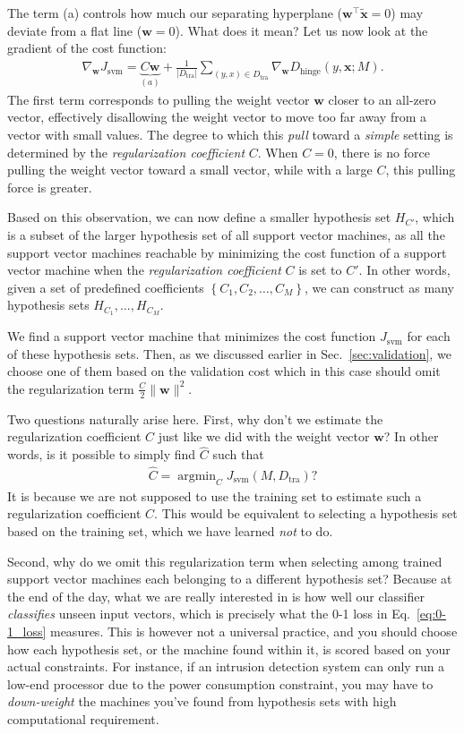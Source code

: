 \documentclass{report}
\newcommand{\vect}[1]{\mathbf{#1}}
\newcommand{\vx}[0]{\vect{x}}
\newcommand{\vw}[0]{\vect{w}}
\DeclareMathOperator*{\argmin}{\arg \min}
\newcommand{\hinge}{\text{hinge}}
\newcommand{\tra}{\text{tra}}
\begin{document}
The term (a) controls how much our separating hyperplane ($\vw^\top
\tilde{\vx}=0$) may deviate from a flat line ($\vw = 0$). What does it mean? Let
us now look at the gradient of the cost function:
\begin{align*}
    \nabla_{\vw} J_{\text{svm}} = 
    \underbrace{
    C \vw 
}_{(a)}
    + 
    \frac{1}{|D_{\tra}|} \sum_{(y,x)
    \in D_{\tra}} \nabla_{\vw} D_{\hinge}(y, \vx; M).
\end{align*}
The first term corresponds to pulling the weight vector $\vw$ closer to an
all-zero vector, effectively disallowing the weight vector to move too far away
from a vector with small values. The degree to which this {\it pull} toward a
{\it simple} setting is determined by the {\it regularization coefficient} $C$.
When $C=0$, there is no force pulling the weight vector toward a small vector,
while with a large $C$, this pulling force is greater. 

Based on this observation, we can now define a smaller hypothesis set $H_{C'}$,
which is a subset of the larger hypothesis set of all support vector machines,
as all the support vector machines reachable by minimizing the cost function of
a support vector machine when the {\it regularization coefficient} $C$ is set to
$C'$. In other words, given a set of predefined coefficients $\left\{ C_1, C_2,
\ldots, C_M\right\}$, we can construct as many hypothesis sets $H_{C_1}, \ldots,
H_{C_M}$. 

We find a support vector machine that minimizes the cost function
$J_{\text{svm}}$ for each of these hypothesis sets. Then, as we discussed
earlier in Sec.~\ref{sec:validation}, we choose one of them based on the
validation cost which in this case should omit the regularization term
$\frac{C}{2} \|\vw\|^2$. 

Two questions naturally arise here. First, why don't we estimate the
regularization coefficient $C$ just like we did with the weight vector $\vw$?
In other words, is it possible to simply find $\hat{C}$ such that 
\begin{align*}
    \hat{C} = \argmin_C J_{\text{svm}}(M, D_{\tra})?
\end{align*}
It is because we are not supposed to use the training set to estimate such a
regularization coefficient $C$. This would be equivalent to selecting a
hypothesis set based on the training set, which we have learned {\it not} to do.

Second, why do we omit this regularization term when selecting among trained
support vector machines each belonging to a different hypothesis set? Because at
the end of the day, what we are really interested in is how well our classifier
{\it classifies} unseen input vectors, which is precisely what the 0-1 loss in
Eq.~\eqref{eq:0-1_loss} measures. This is however not a universal practice, and
you should choose how each hypothesis set, or the machine found within it, is
scored based on your actual constraints. For instance, if an intrusion detection
system can only run a low-end processor due to the power consumption constraint,
you may have to {\it down-weight} the machines you've found from hypothesis sets
with high computational requirement. 
\end{document}
